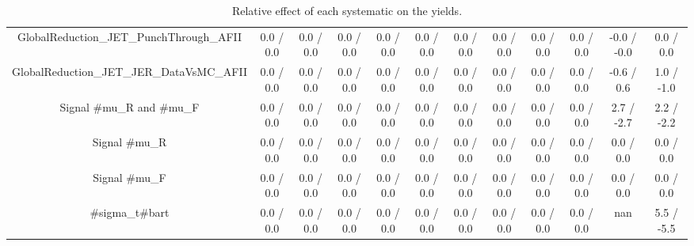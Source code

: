\begin{table}[htbp]
\begin{center}
\begin{tabular}{|c|c|c|c|c|c|c|c|c|c|c|c|}
  GlobalReduction_JET_PunchThrough_AFII & 0.0 / 0.0 & 0.0 / 0.0 & 0.0 / 0.0 & 0.0 / 0.0 & 0.0 / 0.0 & 0.0 / 0.0 & 0.0 / 0.0 & 0.0 / 0.0 & 0.0 / 0.0 & -0.0 / -0.0 & 0.0 / 0.0 \\ 
  GlobalReduction_JET_JER_DataVsMC_AFII & 0.0 / 0.0 & 0.0 / 0.0 & 0.0 / 0.0 & 0.0 / 0.0 & 0.0 / 0.0 & 0.0 / 0.0 & 0.0 / 0.0 & 0.0 / 0.0 & 0.0 / 0.0 & -0.6 / 0.6 & 1.0 / -1.0 \\ 
  Signal #mu_{R} and #mu_{F} & 0.0 / 0.0 & 0.0 / 0.0 & 0.0 / 0.0 & 0.0 / 0.0 & 0.0 / 0.0 & 0.0 / 0.0 & 0.0 / 0.0 & 0.0 / 0.0 & 0.0 / 0.0 & 2.7 / -2.7 & 2.2 / -2.2 \\ 
  Signal #mu_{R} & 0.0 / 0.0 & 0.0 / 0.0 & 0.0 / 0.0 & 0.0 / 0.0 & 0.0 / 0.0 & 0.0 / 0.0 & 0.0 / 0.0 & 0.0 / 0.0 & 0.0 / 0.0 & 0.0 / 0.0 & 0.0 / 0.0 \\ 
  Signal #mu_{F} & 0.0 / 0.0 & 0.0 / 0.0 & 0.0 / 0.0 & 0.0 / 0.0 & 0.0 / 0.0 & 0.0 / 0.0 & 0.0 / 0.0 & 0.0 / 0.0 & 0.0 / 0.0 & 0.0 / 0.0 & 0.0 / 0.0 \\ 
  #sigma_{t#bar{t}} & 0.0 / 0.0 & 0.0 / 0.0 & 0.0 / 0.0 & 0.0 / 0.0 & 0.0 / 0.0 & 0.0 / 0.0 & 0.0 / 0.0 & 0.0 / 0.0 & 0.0 / 0.0 &    nan    & 5.5 / -5.5 \\ 
\hline 
\end{tabular} 
\caption{Relative effect of each systematic on the yields.} 
\end{center} 
\end{table} 
